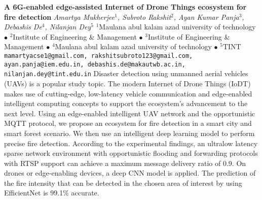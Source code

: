 
    \begin{conf-abstract}[]
        {\textbf{A 6G-enabled edge-assisted Internet of Drone Things ecosystem for fire detection}}
        {\textit{Amartya Mukherjee$^{1}$, Subroto Rakshit$^{2}$, Ayan Kumar Panja$^{3}$, Debashis  De$^{4}$, Nilanjan Dey$^{5}$}}
        {$^{1}$Maulana abul kalam azad university of technology $\bullet$ $^{2}$Institute of Engineering \& Management $\bullet$ $^{3}$Institute of Engineering \& Management $\bullet$ $^{4}$Maulana abul kalam azad university of technology $\bullet$ $^{5}$TINT}
        {\texttt{mamartyacse1@gmail.com, rakshitsubroto123@gmail.com, ayan.panja@iem.edu.in, debashis.de@makautwb.ac.in, nilanjan.dey@tint.edu.in}}
        {Disaster detection using unmanned aerial vehicles (UAVs) is a popular study topic. The modern Internet of Drone Things (IoDT) makes use of cutting-edge, low-latency vehicle communication and edge-enabled intelligent computing concepts to support the ecosystem's advancement to the next level. Using an edge-enabled intelligent UAV network and the opportunistic MQTT protocol, we propose an ecosystem for fire detection in a smart city and smart forest scenario. We then use an intelligent deep learning model to perform precise fire detection. According to the experimental findings, an ultralow latency sparse network environment with opportunistic flooding and forwarding protocols with RTSP support can achieve a maximum message delivery ratio of 0.9. On drones or edge-enabling devices, a deep CNN model is applied. The prediction of the fire intensity that can be detected in the chosen area of interest by using EfficientNet is 99.1\% accurate.}
    \end{conf-abstract}
        